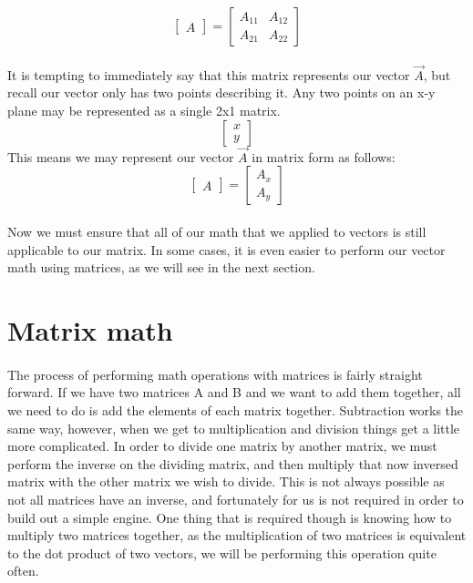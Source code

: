 \documentclass[12pt, letterpaper]{report}
\begin{document}
		\begin{equation}
		\begin{bmatrix}
		A
		\end{bmatrix}
		=
		\begin{bmatrix}
		A_{11} & A_{12}\\
		A_{21} & A_{22}
		\end{bmatrix}
		\end{equation}
		
		\paragraph{} It is tempting to immediately say that this matrix represents our vector $\vec{A}$, but recall our vector only has two points describing it. Any two points on an x-y plane may be represented as a single 2x1 matrix.
		\begin{equation*}
		\begin{bmatrix}
		x\\
		y
		\end{bmatrix}
		\end{equation*}
		This means we may represent our vector $\vec{A}$ in matrix form as follows:
		\begin{equation*}
		\begin{bmatrix}
		A
		\end{bmatrix}
		=
		\begin{bmatrix}
		A_x\\
		A_y
		\end{bmatrix}
		\end{equation*}
		\paragraph{} Now we must ensure that all of our math that we applied to vectors is still applicable to our matrix. In some cases, it is even easier to perform our vector math using matrices, as we will see in the next section.
		\section{Matrix math}
		\paragraph{} The process of performing math operations with matrices is fairly straight forward. If we have two matrices A and B and we want to add them together, all we need to do is add the elements of each matrix together. Subtraction works the same way, however, when we get to multiplication and division things get a little more complicated. In order to divide one matrix by another matrix, we must perform the inverse on the dividing matrix, and then multiply that now inversed matrix with the other matrix we wish to divide. This is not always possible as not all matrices have an inverse, and fortunately for us is not required in order to build out a simple engine. One thing that is required though is knowing how to multiply two matrices together, as the multiplication of two matrices is equivalent to the dot product of two vectors, we will be performing this operation quite often.
\end{document}
